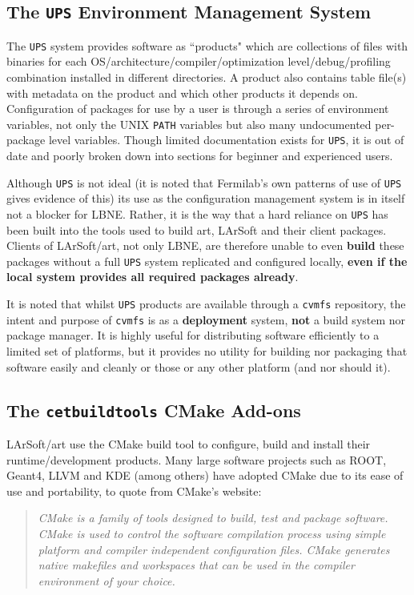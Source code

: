 \documentclass[usletter]{article}
\newcommand{\code}[1]{\texttt{#1}}
\newcommand{\ups}{\code{UPS}\xspace}
\newcommand{\cetbuildtools}{\code{cetbuildtools}\xspace}
\newcommand{\art}{art\xspace}
\newcommand{\larsoft}{LArSoft\xspace}
\begin{document}
\subsection{The \ups Environment Management System}

The \ups system provides software as ``products" which are
 collections of files with binaries for each
OS/architecture/compiler/optimization level/debug/profiling combination installed
in different directories. A product also contains table file(s)
with metadata on the product and which other products it depends on.
Configuration of packages for use by a user is through a series of
environment variables, not only the UNIX \code{PATH} variables but also many
undocumented per-package level variables. Though limited documentation
exists for \ups, it is out of date and poorly broken down into sections
for beginner and experienced users.

Although \ups is not ideal (it is noted that Fermilab's own patterns of use
of \ups gives evidence of this) its use as the configuration management system
is in itself not a blocker for LBNE. Rather, it is the way that a hard
reliance on \ups has been built into the tools used to build \art,
\larsoft and their client packages. Clients of \larsoft/\art, not only
LBNE, are therefore unable to even \textbf{build} these packages without a full
\ups system replicated and configured locally, \textbf{even if the local system
provides all required packages already}.

It is noted that whilst \ups products are available through a \code{cvmfs}
repository, the intent and purpose of \code{cvmfs} is as a \textbf{deployment} system,
\textbf{not} a build system nor package manager. It is highly
useful for distributing software efficiently to a limited set of platforms,
but it provides no utility for building nor packaging that software easily
and cleanly or those or any other platform (and nor should it).

\subsection{The \cetbuildtools CMake Add-ons}

\larsoft/\art use the CMake build tool to configure, build and install
their runtime/development products. Many large software projects such as
ROOT, Geant4, LLVM and KDE (among others) have adopted CMake due to its
ease of use and portability, to quote from CMake's website:

\begin{quote}
\textit{CMake is a family of tools designed to build, test and package software.
 CMake is used to control the software compilation process using simple
 platform and compiler independent configuration files. CMake generates
 native makefiles and workspaces that can be used in the compiler
 environment of your choice.}
\end{quote}
\end{document}
